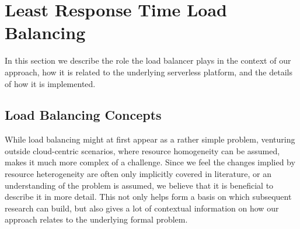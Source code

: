 \documentclass[draft,final]{vutinfth} %
\begin{document}
\section{Least Response Time Load Balancing}
In this section we describe the role the load balancer plays in the context of our approach, how it is related to the underlying serverless platform, and the details of how it is implemented.

\subsection{Load Balancing Concepts}
While load balancing might at first appear as a rather simple problem, venturing outside cloud-centric scenarios, where resource homogeneity can be assumed, makes it much more complex of a challenge.
Since we feel the changes implied by resource heterogeneity are often only implicitly covered in literature, or an understanding of the problem is assumed, we believe that it is beneficial to describe it in more detail. This not only helps form a basis on which subsequent research can build, but also gives a lot of contextual information on how our approach relates to the underlying formal problem.
\end{document}
